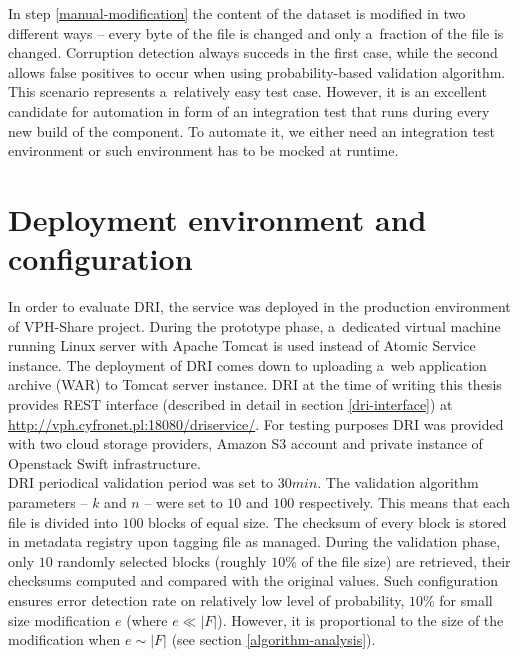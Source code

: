 In step \ref{manual-modification} the content of the dataset
is modified in two different ways -- every byte of the file is changed and only a~fraction of
the file is changed. Corruption detection always succeds in the first case, while the second
allows false positives to occur when using probability-based validation algorithm.\\

This scenario represents a~relatively easy test case. However, it is an excellent candidate for
automation in form of an integration test that runs during every new build of the component.
To automate it, we either need an integration test environment or such environment has to be
mocked at runtime.\\

\section{Deployment environment and configuration}

In order to evaluate DRI, the service was deployed in the production environment
of VPH-Share project. During the prototype phase, a~dedicated virtual machine running Linux
server with Apache Tomcat is used instead of Atomic Service instance. The deployment
of DRI comes down to uploading a~web application archive (WAR) to Tomcat server
instance. DRI at the time of writing this thesis provides REST interface (described
in detail in section \ref{dri-interface}) at \url{http://vph.cyfronet.pl:18080/driservice/}.
For testing purposes DRI was provided with two cloud storage providers, Amazon S3 account
and private instance of Openstack Swift infrastructure.\\

DRI periodical validation period was set to $30 min$. The validation algorithm parameters --
$k$ and $n$ -- were set to $10$ and $100$ respectively. This means that each file is divided
into $100$ blocks of equal size. The checksum of every block is stored in metadata registry
upon tagging file as managed. During the validation phase, only $10$ randomly selected blocks
(roughly $10 \%$ of the file size) are retrieved, their checksums computed and compared
with the original values. Such configuration ensures error detection rate on relatively low
level of probability, $10 \%$ for small size modification $e$ (where $e \ll |F|$). However, it is
proportional to the size of the modification when $e \sim |F|$ (see section \ref{algorithm-analysis}).



